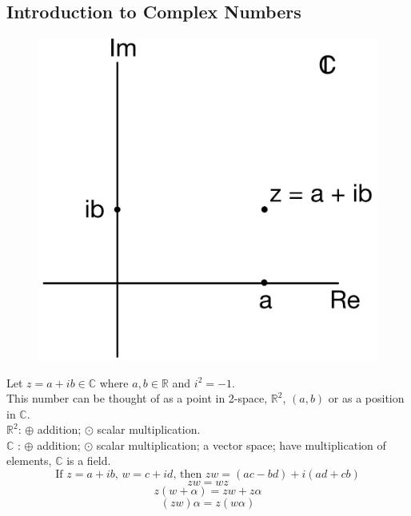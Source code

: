 \documentclass[11pt]{article}
\begin{document}
\subsection{Introduction to Complex Numbers}
\begin{figure}[H]
\includegraphics[scale = 0.15]{1_1}
\centering
\end{figure}
Let $z = a + ib \in \mathbb{C}$ where $a, b \in \mathbb{R}$ and $i ^ 2 = -1$. \\
This number can be thought of as a point in 2-space, $\mathbb{R} ^ 2$, $(a, b)$ or as a position in $\mathbb{C}$. \\ 
$\mathbb{R} ^ 2$: $\oplus$ addition; $\odot$ scalar multiplication. \\
$\mathbb{C}$ : $\oplus$ addition; $\odot$ scalar multiplication; a vector space; have multiplication of elements, $\mathbb{C}$ is a field. \\
\begin{equation*} 
\mbox{If } z = a + ib \mbox{, } w = c + id \mbox{, then }zw = (ac - bd) + i(ad + cb)
\end{equation*}
$$zw = wz$$
$$z(w + \alpha) = zw + z\alpha$$ 
$$(zw)\alpha = z(w\alpha)$$ 
\end{document}
